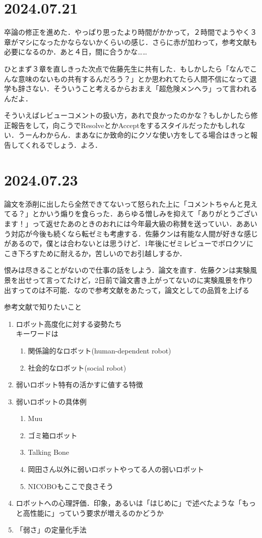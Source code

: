 \documentclass[fleqn,twocolumn]{mynote}
\begin{document}
\section*{2024.07.21}
卒論の修正を進めた．やっぱり思ったより時間がかかって，２時間でようやく３章がマシになったかならないかくらいの感じ．さらに赤が加わって，参考文献も必要になるのか．あと４日，間に合うかな……

ひとまず３章を直しきった次点で佐藤先生に共有した．もしかしたら「なんでこんな意味のないもの共有するんだろう？」とか思われてたら人間不信になって退学も辞さない．そういうこと考えるからおまえ「超危険メンヘラ」って言われるんだよ．

そういえばレビューコメントの扱い方，あれで良かったのかな？もしかしたら修正報告をして，向こうでResolveとかAcceptをするスタイルだったかもしれない．うーんわからん．まあなにか致命的にクソな使い方をしてる場合はきっと報告してくれるでしょう．よろ．

\section*{2024.07.23}
論文を添削に出したら全然できてないって怒られた上に「コメントちゃんと見えてる？」とかいう煽りを食らった．あらゆる憎しみを抑えて「ありがとうございます！」って返せたあのときのおれには今年最大級の称賛を送っていい．ああいう対応が今後も続くなら転ゼミも考慮する．佐藤クンは有能な人間が好きな感じがあるので，僕とは合わないとは思うけど．1年後にゼミレビューでボロクソにこき下ろすために耐えるか，苦しいのでお引越しするか．

恨みは尽きることがないので仕事の話をしよう．論文を直す．佐藤クンは実験風景を出せって言ってたけど，2日前で論文書き上がってないのに実験風景を作り出すってのは不可能．なので参考文献をあたって，論文としての品質を上げる

参考文献で知りたいこと

\begin{enumerate}
  \item ロボット高度化に対する姿勢たち \\ キーワードは
    \begin{enumerate}
      \item 関係論的なロボット(human-dependent robot)
      \item 社会的なロボット(social robot)
    \end{enumerate}
  \item 弱いロボット特有の活かすに値する特徴
  \item 弱いロボットの具体例
    \begin{enumerate}
      \item Muu
      \item ゴミ箱ロボット
      \item Talking Bone
      \item 岡田さん以外に弱いロボットやってる人の弱いロボット
      \item NICOBOもここで良さそう
    \end{enumerate}
  \item ロボットへの心理評価．印象，あるいは「はじめに」で述べたような「もっと高性能に」っていう要求が増えるのかどうか
  \item 「弱さ」の定量化手法
\end{enumerate}
\end{document}
